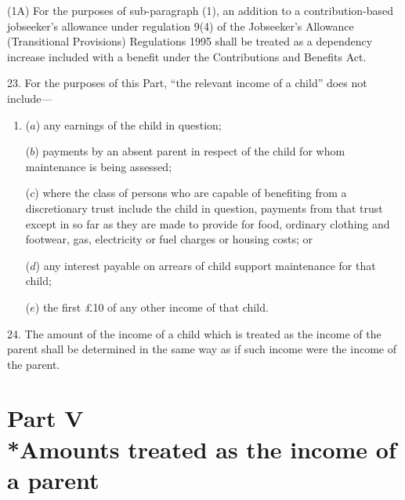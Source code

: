 \documentclass[12pt,a4paper]{article}
\begin{document}
(1A) For the purposes of sub-paragraph (1), an addition to a contribution\hspace{0pt}-based jobseeker’s allowance under regulation 9(4) of the Jobseeker’s Allowance (Transitional Provisions) Regulations 1995 shall be treated as a dependency increase included with a benefit under the Contributions and Benefits Act.


\medskip

23.  For the purposes of this Part, “the relevant income of a child” does not include—
\begin{enumerate}\item[]
($a$) any earnings of the child in question;

($b$) payments by an absent parent in respect of the child for whom maintenance is being assessed;

($c$) where the class of persons who are capable of benefiting from a discretionary trust include the child in question, payments from that trust except in so far as they are made to provide for food, ordinary clothing and footwear, gas, electricity or fuel charges or housing costs; or

($d$) any interest payable on arrears of child support maintenance for that child;

($e$) the first £10 of any other income of that child.
\end{enumerate}


\medskip

24.  The amount of the income of a child which is treated as the income of the parent shall be determined in the same way as if such income were the income of the parent.

\section[Part V --- Amounts treated as the income of a parent]{Part V\\*Amounts treated as the income of a parent}

\renewcommand\parthead{--- Schedule 1 Part V}
\end{document}
